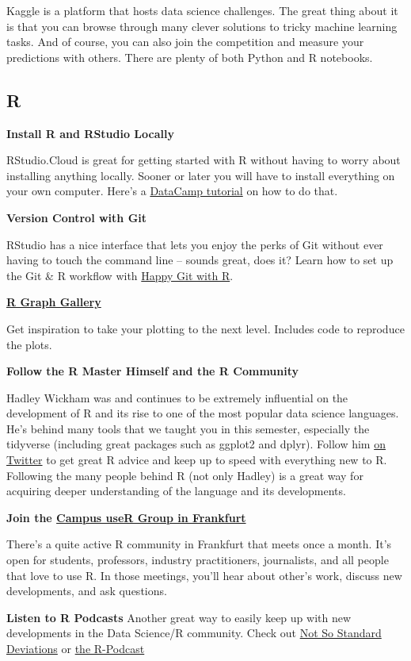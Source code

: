 \documentclass[
  11pt,
]{article}
\newenvironment{tips}[1]
  {
  \begin{itemize}
  \footnotesize
  \renewcommand{\labelitemi}{
    \raisebox{-.7\height}[0pt][0pt]{
      {\setkeys{Gin}{width=3em,keepaspectratio}
        \texttt{[image: images/\#1.png]}}
    }
  }
  \setlength{\fboxsep}{1em}
  \begin{rbox}
  \item
  }
  {
  \end{rbox}
  \end{itemize}
  }
\begin{document}
Kaggle is a platform that hosts data science challenges. The great thing about it is that you can browse through many clever solutions to tricky machine learning tasks. And of course, you can also join the competition and measure your predictions with others. There are plenty of both Python and R notebooks.

\hypertarget{r}{%
\subsection{R}\label{r}}

\begin{tips}r
\textbf{Install R and RStudio Locally}

RStudio.Cloud is great for getting started with R without having to worry about installing anything locally. Sooner or later you will have to install everything on your own computer. Here's a \href{https://www.datacamp.com/community/tutorials/installing-R-windows-mac-ubuntu}{DataCamp tutorial} on how to do that.

\textbf{Version Control with Git}

RStudio has a nice interface that lets you enjoy the perks of Git without ever having to touch the command line -- sounds great, does it? Learn how to set up the Git \& R workflow with \href{https://happygitwithr.com/}{Happy Git with R}.

\textbf{\href{https://www.r-graph-gallery.com/}{R Graph Gallery}}

Get inspiration to take your plotting to the next level. Includes code to reproduce the plots.

\textbf{Follow the R Master Himself and the R Community}

Hadley Wickham was and continues to be extremely influential on the development of R and its rise to one of the most popular data science languages. He's behind many tools that we taught you in this semester, especially the tidyverse (including great packages such as ggplot2 and dplyr). Follow him \href{https://twitter.com/hadleywickham}{on Twitter} to get great R advice and keep up to speed with everything new to R. Following the many people behind R (not only Hadley) is a great way for acquiring deeper understanding of the language and its developments.

\textbf{Join the \href{https://www.meetup.com/r-frankfurt/}{Campus useR Group in Frankfurt}}

There's a quite active R community in Frankfurt that meets once a month. It's open for students, professors, industry practitioners, journalists, and all people that love to use R. In those meetings, you'll hear about other's work, discuss new developments, and ask questions.

\textbf{Listen to R Podcasts}
Another great way to easily keep up with new developments in the Data Science/R community. Check out
\href{http://nssdeviations.com/}{Not So Standard Deviations} or \href{https://r-podcast.org/}{the R-Podcast}

\end{tips}
\end{document}
